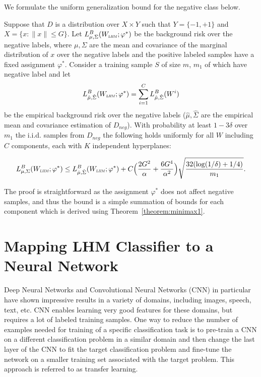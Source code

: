 \documentclass[twoside,11pt]{article}
\newcommand{\wl}{W_{\textsc{\textsc{\relsize{-2}{\textsl{LHM}}}}}}
\begin{document}
We formulate the uniform generalization bound for the negative class below.
\begin{theorem}
Suppose that $D$ is a distribution over $X \times Y$ such that $Y = \{-1,+1\}$ and $X = \{x: \|x\| \le G\}$. Let $L_{\mu,\Sigma}^{B}(\wl;\varphi^*)$ be the background risk over the negative labels, where $\mu, \Sigma$ are the mean and covariance of the marginal distribution of $x$ over the negative labels and the positive labeled samples have a fixed assignment $\varphi^*$. Consider a training sample $S$ of size $m$, $m_1$ of which have negative label and let $$L_{\hat \mu,\hat \Sigma}^{B}(\wl;\varphi^*) = \sum_{i=1}^C L_{\hat \mu,\hat \Sigma}^{B}(W^i)$$  be the empirical background risk over the negative labels ($\hat \mu, \hat \Sigma$ are the empirical mean and covariance estimation of $D_{neg}$). %
With probability at least $1-3\delta$ over $m_1$ the i.i.d. samples from $D_{neg}$ the following holds uniformly for all $W$ including $C$ components, each with $K$ independent hyperplanes:

 $$L_{\mu,\Sigma}^{B}(\wl;\varphi^*) \le L_{\hat \mu,\hat \Sigma}^{B}(\wl;\varphi^*) + C\Big(\frac{2G^2 }{\alpha} + \frac{6G^4}{\alpha^2} \Big) \sqrt{\frac{32(\log(1/\delta) + 1/4)}{m_1}}.$$

\end{theorem}
The proof is straightforward as the assignment $\varphi^*$ does not affect negative samples, and thus the bound is a simple summation of bounds for each component which is derived using Theorem~\ref{theorem:minimax1}.


\section{Mapping LHM Classifier to a Neural Network}
Deep Neural Networks and Convolutional Neural Networks (CNN) in particular have shown impressive results in a variety of domains, including images, speech, text, etc. CNN enables learning very good features for these domains, but requires a lot of labeled training samples. One way to reduce the number of examples needed for training of a specific classification task is to pre-train a CNN on a different classification problem in a similar domain and then change the last layer of the CNN to fit the target classification problem and fine-tune the network on a smaller training set associated with the target problem. This approach is referred to as transfer learning. %
\end{document}
